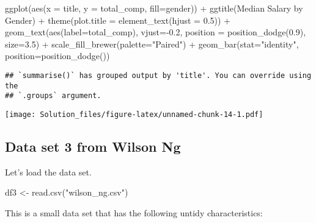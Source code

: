 \documentclass[
]{article}
\newenvironment{Shaded}{\begin{snugshade}}{\end{snugshade}}
\newcommand{\AttributeTok}[1]{\textcolor[rgb]{0.77,0.63,0.00}{#1}}
\newcommand{\FloatTok}[1]{\textcolor[rgb]{0.00,0.00,0.81}{#1}}
\newcommand{\FunctionTok}[1]{\textcolor[rgb]{0.00,0.00,0.00}{#1}}
\newcommand{\NormalTok}[1]{#1}
\newcommand{\OtherTok}[1]{\textcolor[rgb]{0.56,0.35,0.01}{#1}}
\newcommand{\SpecialCharTok}[1]{\textcolor[rgb]{0.00,0.00,0.00}{#1}}
\newcommand{\StringTok}[1]{\textcolor[rgb]{0.31,0.60,0.02}{#1}}
\begin{document}
\begin{Shaded}
\begin{Highlighting}[]
    \FunctionTok{ggplot}\NormalTok{(}\FunctionTok{aes}\NormalTok{(}\AttributeTok{x =}\NormalTok{ title, }\AttributeTok{y =}\NormalTok{ total\_comp, }\AttributeTok{fill=}\NormalTok{gender)) }\SpecialCharTok{+}  
    \FunctionTok{ggtitle}\NormalTok{(}\StringTok{\textquotesingle{}Median Salary by Gender\textquotesingle{}}\NormalTok{) }\SpecialCharTok{+} 
    \FunctionTok{theme}\NormalTok{(}\AttributeTok{plot.title =} \FunctionTok{element\_text}\NormalTok{(}\AttributeTok{hjust =} \FloatTok{0.5}\NormalTok{)) }\SpecialCharTok{+}  
    \FunctionTok{geom\_text}\NormalTok{(}\FunctionTok{aes}\NormalTok{(}\AttributeTok{label=}\NormalTok{total\_comp), }\AttributeTok{vjust=}\SpecialCharTok{{-}}\FloatTok{0.2}\NormalTok{,}
                            \AttributeTok{position =} \FunctionTok{position\_dodge}\NormalTok{(}\FloatTok{0.9}\NormalTok{), }\AttributeTok{size=}\FloatTok{3.5}\NormalTok{) }\SpecialCharTok{+}
                            \FunctionTok{scale\_fill\_brewer}\NormalTok{(}\AttributeTok{palette=}\StringTok{"Paired"}\NormalTok{) }\SpecialCharTok{+}
    \FunctionTok{geom\_bar}\NormalTok{(}\AttributeTok{stat=}\StringTok{"identity"}\NormalTok{, }\AttributeTok{position=}\FunctionTok{position\_dodge}\NormalTok{()) }
\end{Highlighting}
\end{Shaded}

\begin{verbatim}
## `summarise()` has grouped output by 'title'. You can override using the
## `.groups` argument.
\end{verbatim}

\texttt{[image: Solution\_files/figure-latex/unnamed-chunk-14-1.pdf]}

\hypertarget{data-set-3-from-wilson-ng}{%
\subsection{Data set 3 from Wilson Ng}\label{data-set-3-from-wilson-ng}}

Let's load the data set.

\begin{Shaded}
\begin{Highlighting}[]
\NormalTok{df3 }\OtherTok{\textless{}{-}} \FunctionTok{read.csv}\NormalTok{(}\StringTok{"wilson\_ng.csv"}\NormalTok{)}
\end{Highlighting}
\end{Shaded}

This is a small data set that has the following untidy characteristics:
\end{document}
